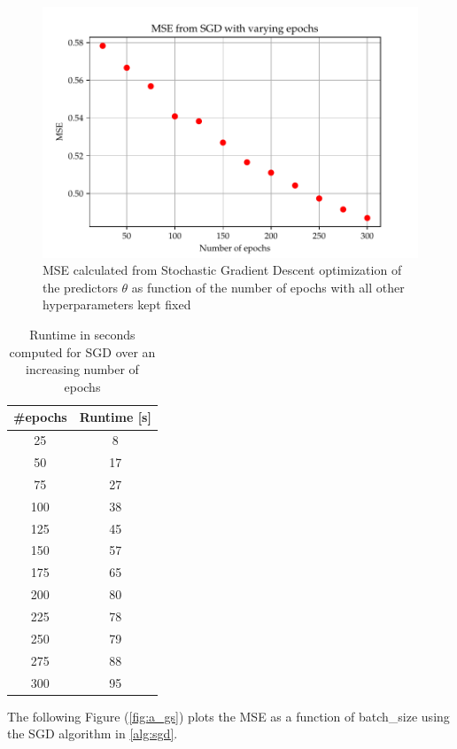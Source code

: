 \documentclass
[twocolumn,
secnumarabic,
nobibnotes,
aps,
prl,
reprint,
groupedaddress,
amsmath,
amssymb
]{revtex4-2}
\begin{document}
\begin{figure}
  \includegraphics[width=\columnwidth]{figures/EX_A_mse_with_varying_epoch.pdf}
  \caption{\label{fig:a_mse_epoch}MSE calculated from Stochastic Gradient Descent optimization of the predictors $\theta$ as function of the number of epochs with all other hyperparameters kept fixed}
\end{figure}

\begin{table}
  \caption{\label{tab:a_epoch_run}Runtime in seconds computed for SGD over an increasing number of epochs}
  \begin{tabular}{|c|c|}
    \hline
    \#epochs & Runtime [s] \\ \hline
    25       & 8           \\
    50       & 17          \\
    75       & 27          \\
    100      & 38          \\
    125      & 45          \\
    150      & 57          \\
    175      & 65          \\
    200      & 80          \\
    225      & 78          \\
    250      & 79          \\
    275      & 88          \\
    300      & 95          \\
    \hline
  \end{tabular}
\end{table}

The following Figure (\ref{fig:a_gs}) plots the MSE as a function of batch\_size using the SGD algorithm in \ref{alg:sgd}.
\end{document}
